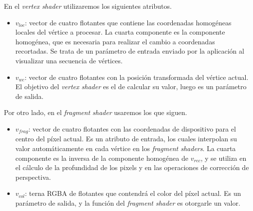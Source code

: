 En el \textit{vertex shader} utilizaremos los siguientes atributos.
\begin{itemize}
    \item $v_{loc}$: vector de cuatro flotantes que contiene las coordenadas
    homogéneas locales del vértice a procesar. La cuarta componente es la componente homogénea, que es necesaria para realizar el cambio a coordenadas recortadas. Se trata de un parámetro de entrada enviado por la aplicación al visualizar una secuencia de vértices.
    \item $v_{wc}$: vector de cuatro flotantes con la posición transformada del vértice actual. El objetivo del \textit{vertex shader} es el de calcular su valor, luego es un parámetro de salida. 
\end{itemize}
Por otro lado, en el \textit{fragment shader} usaremos los que siguen.
\begin{itemize}
    \item $v_{frag}$: vector de cuatro flotantes con las coordenadas de dispositivo para el centro del píxel actual. Es un atributo de entrada, los cuales interpolan su valor automáticamente en cada vértice en los \textit{fragment shaders}. La cuarta componente es la inversa de la componente homogénea de $v_{rec}$, y se utiliza en el cálculo de la profundidad de los pixels y en las operaciones de corrección de perspectiva.
    \item $v_{col}$: terna RGBA de flotantes que contendrá el color del píxel actual. Es un parámetro de salida, y la función del \textit{fragment shader} es otorgarle un valor.
\end{itemize}

